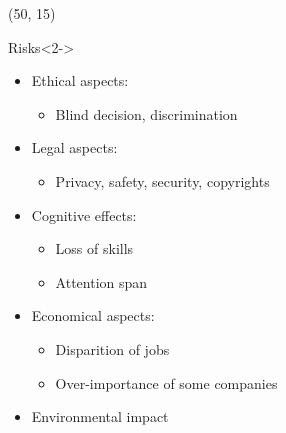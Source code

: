 \begin{frame}
  \begin{textblock}{45}(50, 15)
    \begin{block}{Risks}<2->
      \begin{itemize}
      \item Ethical aspects:
        \begin{itemize}
        \item Blind decision, discrimination
        \end{itemize}
      \item Legal aspects:
        \begin{itemize}
        \item Privacy, safety, security, copyrights
        \end{itemize}
      \item Cognitive effects:
        \begin{itemize}
        \item Loss of skills
        \item Attention span
        \end{itemize}
      \item Economical aspects:
        \begin{itemize}
        \item Disparition of jobs
        \item Over-importance of some companies
        \end{itemize}
      \item Environmental impact
      \end{itemize}
    \end{block}
  \end{textblock}
\end{frame}


